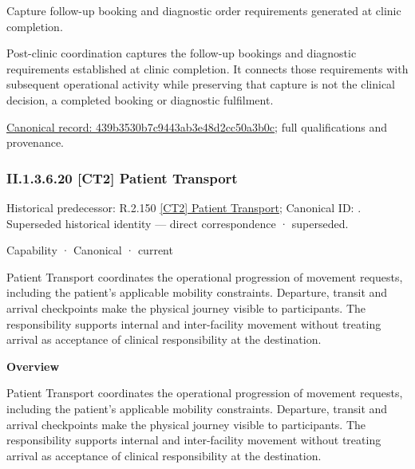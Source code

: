 Capture follow-up booking and diagnostic order requirements generated at clinic completion.



Post-clinic coordination captures the follow-up bookings and diagnostic requirements established at clinic completion. It connects those requirements with subsequent operational activity while preserving that capture is not the clinical decision, a completed booking or diagnostic fulfilment.


{\footnotesize \href{../../../../../../../continuum/strategy/capability/feature/439b3530b7c9443ab3e48d2cc50a3b0c.md}{Canonical record: 439b3530b7c9443ab3e48d2cc50a3b0c}; full qualifications and provenance.}\par
\subsubsection*{II.1.3.6.20 [CT2] Patient Transport}
\label{navigation:II.1.3.6.20}

{\small Historical predecessor: R.2.150 \hyperref[element:e9c1a897884f4d758f5654b824364030]{[CT2] Patient Transport}; Canonical ID: \texttt{}. Superseded historical identity — direct correspondence · superseded.}\par
\label{element:6041d7c0cc5d4519aaea584bb4e6d365}
{\small Capability · Canonical · current}\par

Patient Transport coordinates the operational progression of movement requests, including the patient's applicable mobility constraints. Departure, transit and arrival checkpoints make the physical journey visible to participants. The responsibility supports internal and inter-facility movement without treating arrival as acceptance of clinical responsibility at the destination.



\textbf{Overview}



Patient Transport coordinates the operational progression of movement requests, including the patient's applicable mobility constraints. Departure, transit and arrival checkpoints make the physical journey visible to participants. The responsibility supports internal and inter-facility movement without treating arrival as acceptance of clinical responsibility at the destination.



